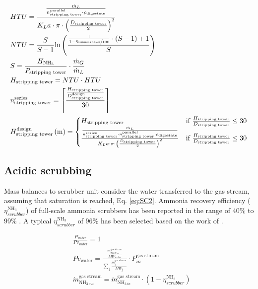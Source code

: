\begin{refsection}[referencesApD]
\allowdisplaybreaks
\begin{align}
& HTU = \frac{\frac{\dot{m}_L}{n_{\text{stripping tower}}^{\text{parallel}} \cdot\rho_{\text{digestate}}}}{K_{L}a \cdot \pi \cdot \left(\frac{D_{\text{stripping tower}}}{2}\right)^2} \label{eq:HTUStripping} \\
& NTU = \frac{S}{S-1} \text{ln}\left(\frac{\frac{1}{1-\sfrac{\eta_{\text{stripping tower}}}{100}} \cdot \left(S-1\right) + 1}{S}\right) \label{eq:NTUStripping} \\
& S = \frac{H_{\text{NH}_3}}{P_{\text{stripping tower}}} \cdot \frac{\dot{m}_G}{\dot{m}_L} \\
& H_{\text{stripping tower}} = NTU \cdot HTU \label{eq:HStripping} \\
& n_{\text{stripping tower}}^{\text{series}} = \ceil*{\frac{\frac{H_{\text{stripping tower}}}{ D_{\text{stripping tower}}^{\text{design}}}}{30}}\label{eq:nStrippersSerie}\\
& H_{\text{stripping tower}}^{\text{design}} \left(\text{m}\right) =
\begin{cases}
H_{\text{stripping tower}} & \text{if } 	\frac{H_{\text{stripping tower}}}{D_{\text{stripping tower}}} \leq 30  
\\
\frac{\frac{\dot{m}_L}{n_{\text{stripping tower}}^{\text{series}} \cdot n_{\text{stripping tower}}^{\text{parallel}} \cdot\rho_{\text{digestate}}}}{K_{L}a \cdot \pi \cdot \left(\frac{D_{\text{stripping tower}}}{2}\right)^2} & \text{if } 	\frac{H_{\text{stripping tower}}}{D_{\text{stripping tower}}} \leq 30  
\end{cases} \label{eq:Stripping2Ddesign}
\end{align}

\subsection{Acidic scrubbing}\label{section:AcidicScrubbingNRecoveryPaper}
Mass balances to scrubber unit consider the water transferred to the gas stream, assuming that saturation is reached, Eq. \ref{eq:SC2}. Ammonia  recovery efficiency ($\eta_{scrubber}^{\text{NH}_3}$) of full-scale ammonia scrubbers has been reported in the range of 40\% to 99\% \citep{melse2005air}. A typical $\eta_{scrubber}^{\text{NH}_3}$ of 96\% has been selected based on the work of \citet{melse2005air}.

\begin{align}
& \frac{P_{\text{water}}}{Pv_{\text{water}}} = 1 \label{eq:SC1} 
\\
& Pv_{\text{water}} = \frac{\frac{\dot{m}_{\text{water}_{out}}^{\text{gas stream}}}{MW_\text{water}}}
{\sum_{j}\frac{\dot{m}_{\text{j}}^{\text{gas stream}}}{MW_\text{j}}}
\cdot P_{in}^{\text{gas stream}} \label{eq:SC2} 
\\
& \dot{m}_{\text{NH}_{3 \ out}}^{\text{gas stream}} = \dot{m}_{\text{NH}_{3 \ in}}^{\text{gas stream}} \cdot \left(1-\eta_{scrubber}^{\text{NH}_3}\right) \label{eq:SC3}
\end{align}


\end{refsection}
